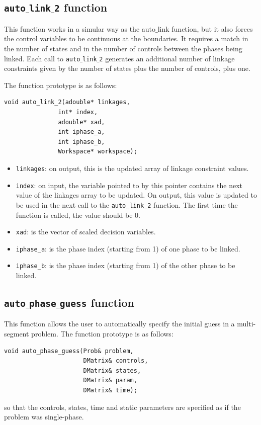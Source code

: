 \documentclass[a4paper,11pt]{report}    %
\begin{document}
\subsection{ \texttt{auto$\_$link$\_$2} function}

This function works in a simular way as the auto$\_$link function, but it also
forces the control variables to be continuous at the boundaries. It requires a match
in the number of states and in the number of controls between the phases being linked.
Each call to \texttt{auto$\_$link$\_$2} generates an additional number of linkage constraints given
by the number of states plus the number of controls,  plus one.

The function prototype is as follows:

\begin{verbatim}
void auto_link_2(adouble* linkages, 
               int* index, 
               adouble* xad, 
               int iphase_a, 
               int iphase_b,
               Workspace* workspace);
\end{verbatim}

\begin{itemize}
 \item \verb|linkages|: on output, this is the updated array of linkage constraint values.
 \item \verb|index|:    on input, the variable pointed to by this pointer contains the next value of the linkages array to be updated. On output,
this value is updated to be used in the next call to the \verb|auto_link_2| function. The first time the function is called, the value should be 0.
 \item \verb|xad|: is the vector of scaled decision variables.
 \item \verb|iphase_a|:  is the phase index (starting from 1) of one phase to be linked.
  \item \verb|iphase_b|:  is the phase index (starting from 1) of the other phase to be linked.
\end{itemize}




\subsection{ \texttt{auto$\_$phase$\_$guess} function}

This function allows the user to automatically specify the initial guess
in a multi-segment problem. The function prototype is as follows:

\begin{verbatim}
void auto_phase_guess(Prob& problem, 
                      DMatrix& controls, 
                      DMatrix& states, 
                      DMatrix& param, 
                      DMatrix& time);
\end{verbatim}
so that the controls, states, time and static parameters are specified as if the
problem was single-phase. 
\end{document}
